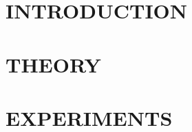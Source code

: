 \documentclass[a4paper,12pt]{report}
\begin{document}






\tableofcontents
\thispagestyle{empty}
\setcounter{page}{0}

\newpage
\chapter{INTRODUCTION}


\chapter{THEORY}


\chapter{EXPERIMENTS}



\end{document}

